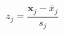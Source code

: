 \begin{equation}
	z_j
	=
	\frac{
		\mathbf{x}_{j}
		-
		\bar{x}_{j}
		}{
		s_{j}
	}
	\label{eq:linearAlgebra-z-multivariate}
\end{equation}
